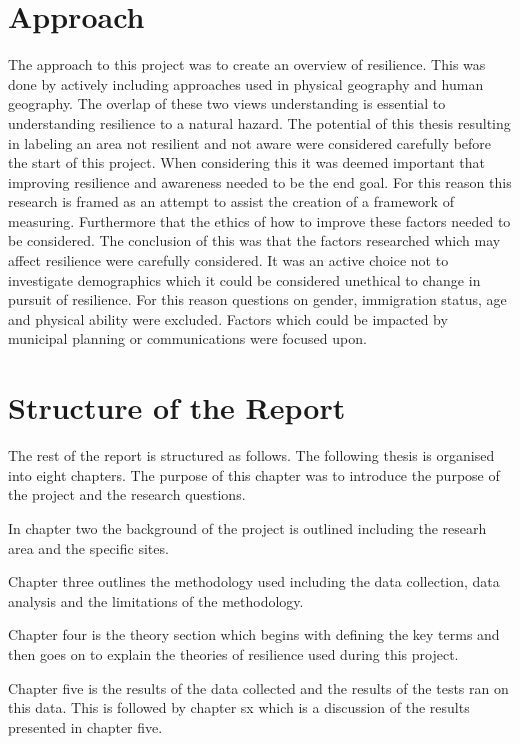 \section{Approach}

The approach to this project was to create an overview of resilience. This was done by actively including approaches used in physical geography and human geography. The overlap of these two views understanding is essential to understanding resilience to a natural hazard. The potential of this thesis resulting in labeling an area not resilient and not aware were considered carefully before the start of this project. When considering this it was deemed important that improving resilience and awareness needed to be the end goal. For this reason this research is framed as an attempt to assist the creation of a framework of measuring. Furthermore that the ethics of how to improve these factors needed to be considered. The conclusion of this was that the factors researched which may affect resilience were carefully considered. It was an active choice not to investigate demographics which it could be considered unethical to change in pursuit of resilience. For this reason questions on gender, immigration status, age and physical ability were excluded. Factors which could be impacted by municipal planning or communications were focused upon. 


\section{Structure of the Report}
The rest of the report is structured as follows. 
The following thesis is organised into eight chapters. The purpose of this chapter was to introduce the purpose of the project and the research questions.

In chapter two the background of the project is outlined including the researh area and the specific sites. 

Chapter three outlines the methodology used including the data collection, data analysis and the limitations of the methodology.

Chapter four is the theory section which begins with defining the key terms and then goes on to explain the theories of resilience used during this project.

Chapter five is the results of the data collected and the results of the tests ran on this data. This is followed by chapter sx which is a discussion of the results presented in chapter five. 

